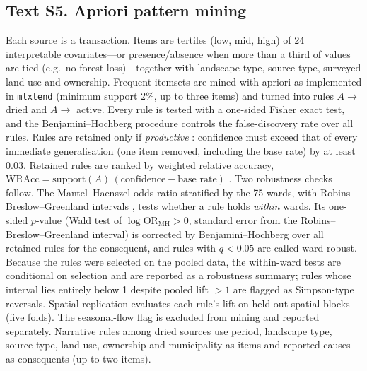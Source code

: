 \subsection*{Text S5. Apriori pattern mining}
Each source is a transaction. Items are tertiles (low, mid, high) of 24 interpretable covariates---or presence/absence when more than a third of values are tied (e.g.\ no forest loss)---together with landscape type, source type, surveyed land use and ownership. Frequent itemsets are mined with apriori \citep{agrawal1994fast} as implemented in \texttt{mlxtend} \citep{raschka2018mlxtend} (minimum support 2\%, up to three items) and turned into rules $A \rightarrow$ dried and $A \rightarrow$ active. Every rule is tested with a one-sided Fisher exact test, and the Benjamini--Hochberg procedure controls the false-discovery rate over all rules. Rules are retained only if \emph{productive} \citep{webb2007discovering}: confidence must exceed that of every immediate generalisation (one item removed, including the base rate) by at least 0.03. Retained rules are ranked by weighted relative accuracy, $\mathrm{WRAcc} = \mathrm{support}(A)\,(\mathrm{confidence}-\text{base rate})$ \citep{lavrac2004subgroup}. Two robustness checks follow. The Mantel--Haenszel odds ratio stratified by the 75 wards, with Robins--Breslow--Greenland intervals \citep{robins1986general}, tests whether a rule holds \emph{within} wards. Its one-sided $p$-value (Wald test of $\log \mathrm{OR}_{\mathrm{MH}} > 0$, standard error from the Robins--Breslow--Greenland interval) is corrected by Benjamini--Hochberg over all retained rules for the consequent, and rules with $q < 0.05$ are called ward-robust. Because the rules were selected on the pooled data, the within-ward tests are conditional on selection and are reported as a robustness summary; rules whose interval lies entirely below 1 despite pooled lift $>1$ are flagged as Simpson-type reversals. Spatial replication evaluates each rule's lift on held-out spatial blocks (five folds). The seasonal-flow flag is excluded from mining and reported separately. Narrative rules among dried sources use period, landscape type, source type, land use, ownership and municipality as items and reported causes as consequents (up to two items).

